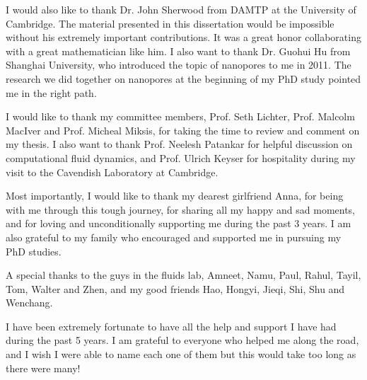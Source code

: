 \documentclass[12pt]{nuthesis}	%
\begin{document}
I would also like to thank Dr. John Sherwood from DAMTP at the University of Cambridge. The material presented in this dissertation would be impossible without his extremely important contributions. It was a great honor collaborating with a great mathematician like him. I also want to thank Dr. Guohui Hu from Shanghai University, who introduced the topic of nanopores to me in 2011. The research we did together on nanopores at the beginning of my PhD study pointed me in the right path.

I would like to thank my committee members, Prof. Seth Lichter, Prof. Malcolm MacIver and Prof. Micheal Miksis, for taking the time to review and comment on my thesis. I also want to thank Prof. Neelesh Patankar for helpful discussion on computational fluid dynamics, and Prof. Ulrich Keyser for hospitality during my visit to the Cavendish Laboratory at Cambridge.

Most importantly, I would like to thank my dearest girlfriend Anna, for being with me through this tough journey, for sharing all my happy and sad moments, and for loving and unconditionally supporting me during the past 3 years. I am also grateful to my family who encouraged and supported me in pursuing my PhD studies.

A special thanks to the guys in the fluids lab, Amneet, Namu, Paul, Rahul, Tayil, Tom, Walter and Zhen, and my good friends Hao, Hongyi, Jieqi, Shi, Shu and Wenchang.

I have been extremely fortunate to have all the help and support I have had during the past 5 years. I am grateful to everyone who helped me along the road, and I wish I were able to name each one of them but this would take too long as there were many! 

%

%
%
%
%
%
%
%
%

\clearpage{} %
\tableofcontents	%

\clearpage{} %
\listoftables		%
\end{document}
